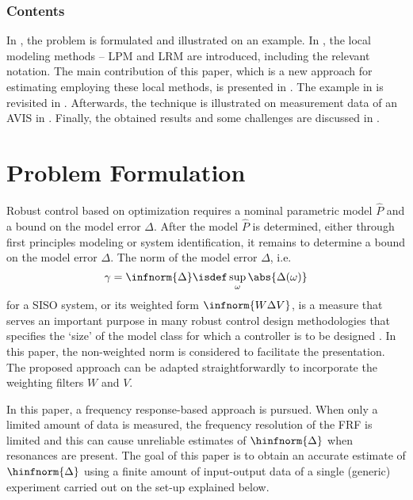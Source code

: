 \subsubsection{Contents}
\label{par:toc}
In , the problem is formulated and illustrated on an example.
In , the local modeling methods -- \gls{LPM} and \gls{LRM} are introduced, including the relevant notation.
The main contribution of this paper, which is a new approach for estimating \norm{\Delta} employing these local methods, is presented in . The example in  is revisited in .
Afterwards, the technique is illustrated on measurement data of an \gls{AVIS} in .
Finally, the obtained results and some challenges are discussed in .

\glsresetall %

\section{Problem Formulation}
\label{sec:Problem}
Robust control based on \Hinf{} optimization requires a nominal parametric model $\hat P$ and a bound on the model error $\Delta$. 
After the model $\hat P$ is determined, either through first principles modeling or system identification, it remains to determine a bound on the model error $\Delta$. 
The \Hinf{} norm of the model error $\Delta$, i.e.
\begin{equation}
  \gamma = \infnorm{\Delta} \isdef \sup_{\omega} \abs{\Delta(\omega)}
  \label{eq:HinfNormSISO}
\end{equation}
for a \gls{SISO} system, or its weighted form $\infnorm{W \Delta V}$, is a measure that serves an important purpose in many robust control design methodologies that specifies the `size' of the model class for which a controller is to be designed \citep{Skogestad2005,Oomen2012SIRP}.
In this paper, the non-weighted \Hinf{} norm is considered to facilitate the presentation. 
The proposed approach can be adapted straightforwardly to incorporate the weighting filters $W$ and $V$.

In this paper, a frequency response-based approach is pursued. 
When only a limited amount of data is measured, the frequency resolution of the \gls{FRF} is limited and this can cause unreliable estimates of $\hinfnorm{\Delta}$ when resonances are present. 
The goal of this paper is to obtain an accurate estimate of $\hinfnorm{\Delta}$ using a finite amount of input-output data of a single (generic) experiment carried out on the set-up explained below.

